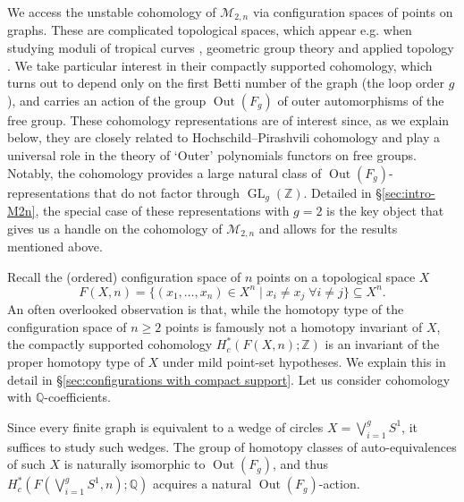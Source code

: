 \documentclass[12pt]{article}
\newcommand{\Z}{\mathbb{Z}}
\newcommand{\Q}{\mathbb{Q}}
\newcommand{\ModuliCurve}[1]{\mathcal{M}_{#1}}
\DeclareMathOperator{\GL}{GL}
\DeclareMathOperator{\Out}{Out}
\theoremstyle{plain}
\theoremstyle{definition}
\theoremstyle{remark}
\begin{document}
We access the unstable cohomology of $\ModuliCurve{2,n}$ via configuration spaces of points on graphs. These are complicated topological spaces, which appear e.g. when studying moduli of tropical curves \cite{BCGY21}, geometric group theory and applied topology \cite{GK02}.
We take particular interest in their compactly supported cohomology, which turns out to depend only on the first Betti number of the graph (the loop order $g$), and carries an action of the group $\Out(F_g)$ of outer automorphisms of the free group. These cohomology representations are of interest since, as we explain below, they are closely related to Hochschild--Pirashvili cohomology and play a universal role in the theory of `Outer' polynomials functors on free groups. Notably, the cohomology provides a large natural class of $\Out(F_g)$-representations that do not factor through $\GL_g(\mathbb{Z})$. Detailed in \S\ref{sec:intro-M2n}, the special case of these representations with $g=2$ is the key object that gives us a handle on the cohomology of $\ModuliCurve{2,n}$ and allows for the results mentioned above.


Recall the (ordered) configuration space of $n$ points on a topological space $X$
\[
    F(X,n) = \{(x_1, \ldots, x_n) \in X^n \mid x_i\neq x_j \; \forall i\neq j\} \subseteq X^n.
\]
An often overlooked observation is that, while the homotopy type of the configuration space of $n\geq 2$ points is famously not a homotopy invariant of $X$, the compactly supported cohomology $H^*_c(F(X,n);\Z)$ is an invariant of the proper homotopy type of $X$ under mild point-set hypotheses. We explain this in detail in \S\ref{sec:configurations with compact support}. Let us consider cohomology with $\Q$-coefficients.

Since every finite graph is equivalent to a wedge of circles $X = \bigvee_{i=1}^g S^1$, it suffices to study such wedges. The group of homotopy classes of auto-equivalences of such $X$ is naturally isomorphic to $\Out(F_g)$, and thus $H^*_c(F(\bigvee_{i=1}^g{S^1}, n); \Q)$ acquires a natural $\Out(F_g)$-action.
\end{document}
